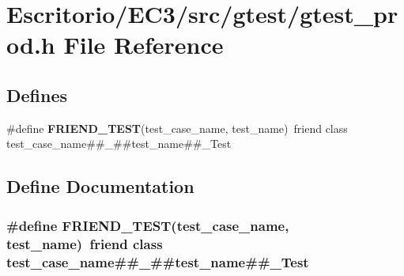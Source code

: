 \section{Escritorio/EC3/src/gtest/gtest\_\-prod.h File Reference}
\label{gtest__prod_8h}
\subsection*{Defines}
\begin{CompactItemize}
\item 
\#define {\bf FRIEND\_\-TEST}(test\_\-case\_\-name, test\_\-name)~friend class test\_\-case\_\-name\#\#\_\-\#\#test\_\-name\#\#\_\-Test
\end{CompactItemize}


\subsection{Define Documentation}
\subsubsection{\setlength{\rightskip}{0pt plus 5cm}\#define FRIEND\_\-TEST(test\_\-case\_\-name, test\_\-name)~friend class test\_\-case\_\-name\#\#\_\-\#\#test\_\-name\#\#\_\-Test}\label{gtest__prod_8h_96638acc779786cb17271d68b40ba6ef}


